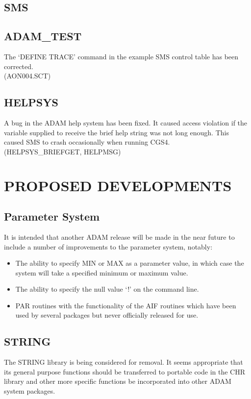 \subsection{SMS}

\subsection{ADAM\_TEST}
The `DEFINE TRACE' command in the example SMS control table has been
corrected.\\
(AON004.SCT)

\subsection{HELPSYS}
A bug in the ADAM help system has been fixed. It caused access violation if 
the variable supplied to receive the brief help string was not long enough. 
This caused SMS to crash occasionally when running CGS4.\\
(HELPSYS\_BRIEFGET, HELPMSG)

\section{PROPOSED DEVELOPMENTS}
\subsection{Parameter System}
It is intended that another ADAM release will be made in the near future to
include a number of improvements to the parameter system, notably:
\begin{itemize}
\item The ability to specify MIN or MAX as a parameter value, in which case
the system will take a specified minimum or maximum value.
\item The ability to specify the null value `!' on the command line.
\item PAR routines with the functionality of the AIF routines which have been
used by several packages but never officially released for use.
\end{itemize}

\subsection{STRING}
The STRING library is being considered for removal. It seems appropriate that
its general purpose functions should be transferred to portable code in the
CHR library and other more specific functions be incorporated into other
ADAM system packages.


